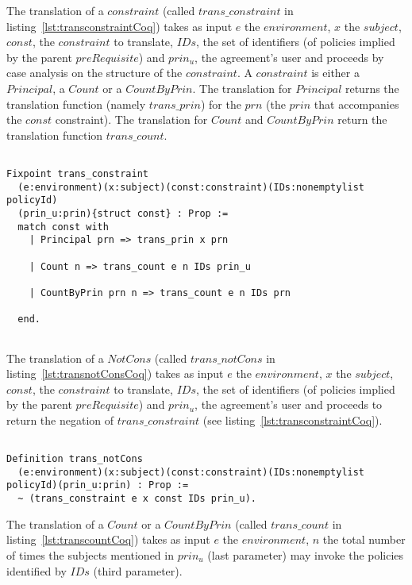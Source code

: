 The translation of a $constraint$ (called $trans\_constraint$ in listing~\ref{lst:transconstraintCoq}) takes as input $e$ the $environment$, $x$ the $subject$, $const$, the $constraint$ to translate, $IDs$, the set of identifiers (of policies implied by the parent $preRequisite$) and $prin_{u}$, the agreement's user and proceeds by case analysis on the structure of the $constraint$. A $constraint$ is either a $Principal$, a $Count$ or a $CountByPrin$. The translation for $Principal$ returns the translation function (namely $trans\_prin$) for the $prn$ (the $prin$ that accompanies the $const$ constraint). The translation for $Count$ and $CountByPrin$ return the translation function $trans\_count$. 


\begin{lstlisting}

Fixpoint trans_constraint 
  (e:environment)(x:subject)(const:constraint)(IDs:nonemptylist policyId)
  (prin_u:prin){struct const} : Prop := 
  match const with
    | Principal prn => trans_prin x prn
  
    | Count n => trans_count e n IDs prin_u

    | CountByPrin prn n => trans_count e n IDs prn 

  end.
  
\end{lstlisting}


The translation of a $NotCons$ (called $trans\_notCons$ in listing~\ref{lst:transnotConsCoq}) takes as input $e$ the $environment$, $x$ the $subject$, $const$, the $constraint$ to translate, $IDs$, the set of identifiers (of policies implied by the parent $preRequisite$) and $prin_{u}$, the agreement's user and proceeds to return the negation of $trans\_constraint$ (see listing~\ref{lst:transconstraintCoq}).

\begin{lstlisting}

Definition trans_notCons
  (e:environment)(x:subject)(const:constraint)(IDs:nonemptylist policyId)(prin_u:prin) : Prop :=
  ~ (trans_constraint e x const IDs prin_u).
\end{lstlisting}


The translation of a $Count$ or a $CountByPrin$ (called $trans\_count$ in listing~\ref{lst:transcountCoq}) takes as input $e$ the $environment$, $n$ the total number of times the subjects mentioned in $prin_{u}$ (last parameter) may invoke the policies identified by $IDs$ (third parameter).

